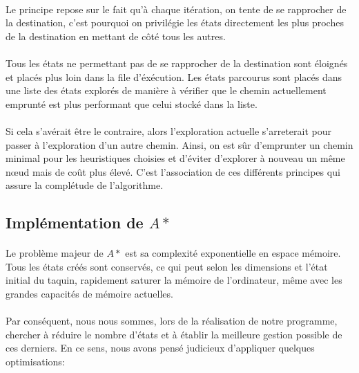 \documentclass[10pt,a4paper]{report}
\begin{document}
\paragraph{}{Le principe repose sur le fait qu'à chaque itération, on tente de se rapprocher de la destination, c’est pourquoi on privilégie les états directement les plus proches de la destination en mettant de côté tous les autres.}
\paragraph{}{Tous les états ne permettant pas de se rapprocher de la destination sont éloignés et placés plus loin dans la file d'éxécution. Les états parcourus sont placés dans une liste des états explorés de manière à vérifier que le chemin actuellement emprunté est plus performant que celui stocké dans la liste.}
\paragraph{}{Si cela s'avérait être le contraire, alors l'exploration actuelle s'arreterait pour passer à l'exploration d'un autre chemin. Ainsi, on est sûr d'emprunter un chemin minimal pour les heuristiques choisies et d'éviter d'explorer à nouveau un même nœud mais de coût plus élevé. C'est l'association de ces différents principes qui assure la complétude de l'algorithme.}
\subsection{Implémentation de $A*$}
\paragraph{}{Le problème majeur de $A*$ est sa complexité exponentielle en espace mémoire. Tous les états créés sont conservés, ce qui peut selon les dimensions et l'état initial du taquin, rapidement saturer la mémoire de l'ordinateur, même avec les grandes capacités de mémoire actuelles.}
\paragraph{}{Par conséquent, nous nous sommes, lors de la réalisation de notre programme, chercher à réduire le nombre d’états et à établir la meilleure gestion possible de ces derniers. En ce sens, nous avons pensé judicieux d'appliquer quelques optimisations:}
\end{document}
